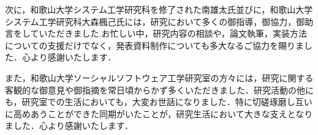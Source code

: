 \documentclass[11pt,dvipdfmx]{jreport}
\begin{document}
次に，和歌山大学システム工学研究科を修了された南雄太氏並びに，和歌山大学システム工学研究科大森楓己氏には，研究において多くの御指導，御協力，御助言をしていただきました.お忙しい中，研究内容の相談や，論文執筆，実装方法についての支援だけでなく，発表資料制作についても多大なるご協力を賜りました．心より感謝いたします．

また，和歌山大学ソーシャルソフトウェア工学研究室の方々には，研究に関する客観的な御意見や御指摘を常日頃からかず多くいただきました．研究活動の他にも，研究室での生活においても，大変お世話になりました．特に切磋琢磨し互いに高めあうことができた同期がいたことが，研究生活において大きな支えとなりました．心より感謝いたします．











% 
% 
% 

\end{document}
